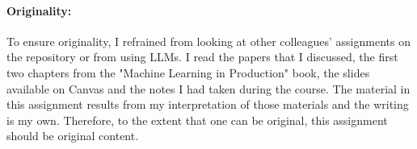 \documentclass[11pt]{article}
\begin{document}
\paragraph{Originality:}
To ensure originality, I refrained from looking at other colleagues' assignments on the repository or from using LLMs.
I read the papers that I discussed, the first two chapters from the "Machine Learning in Production" book, the slides available on Canvas and the notes I had taken during the course.
The material in this assignment results from my interpretation of those materials and the writing is my own.
Therefore, to the extent that one can be original, this assignment should be original content.



\end{document}
